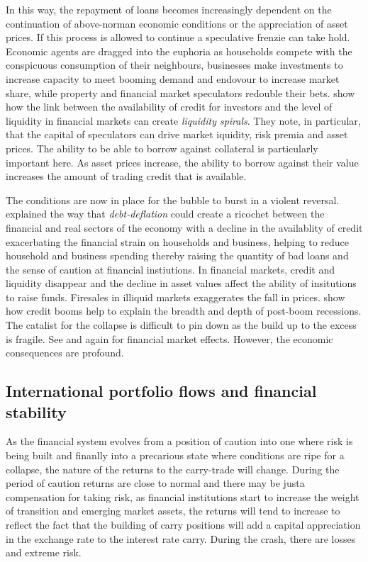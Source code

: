 \documentclass[12pt, a4paper, oneside]{article} %
\begin{document}
In this way, the repayment of loans becomes increasingly dependent on the continuation of above-norman economic conditions or the appreciation of asset prices.  If this process is allowed to continue a speculative frenzie can take hold.  Economic agents are dragged into the euphoria as households compete with the conspicuous consumption of their neighbours, businesses make investments to increase capacity to meet booming demand and endovour to increase market share, while property and financial market speculators redouble their bets.  \citet{BrunnermeierLiquidity} show how the link between the availability of credit for investors and the level of liquidity in financial markets can create \emph{liquidity spirals}.   They note, in particular, that the capital of speculators can drive market iquidity, risk premia and asset prices.  The ability to be able to borrow against collateral is particularly important here.  As asset prices increase, the ability to borrow against their value increases the amount of trading credit that is available.  

The conditions are now in place for the bubble to burst in a violent reversal.  \citet{FisherBD, FisherDD} explained the way that \emph{debt-deflation} could create a ricochet between the financial and real sectors of the economy with a decline in the availablity of credit exacerbating the financial strain on households and business, helping to reduce household and business spending thereby raising the quantity of bad loans and the sense of caution at financial instiutions. In financial markets, credit and liquidity disappear and the decline in asset values affect the ability of insitutions to raise funds.  Firesales in illiquid markets exaggerates the fall in prices. \citet{ReinhartRogoff} show how credit booms help to explain the breadth and depth of post-boom recessions.  The catalist for the collapse is difficult to pin down as the build up to the excess is fragile.  See \citet{Gorton2013} and \citet{BrunnermeierLiquidity} again for financial market effects. However, the economic consequences are profound.  


\subsection{International portfolio flows and financial stability}
As the financial system evolves from a position of caution into one where risk is being built and finanlly into a precarious state where conditions are ripe for a collapse, the nature of the returns to the carry-trade will change. During the period of caution returns are close to normal and there may be justa compensation for taking risk, as financial institutions start to increase the weight of transition and emerging market assets, the returns will tend to increase to reflect the fact that the building of carry positions will add a capital appreciation in the exchange rate to the interest rate carry. During the crash, there are losses and extreme risk.   
\end{document}
